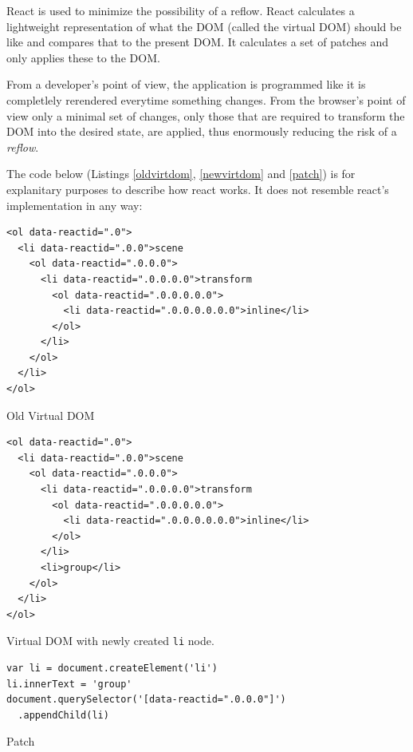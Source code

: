 React is used to minimize the possibility of a reflow. React
calculates a lightweight representation of what the \gls{DOM} (called the virtual DOM) should be like and
compares that to the present \gls{DOM}. It calculates a set of patches and
only applies these to the \gls{DOM}.

From a developer's point of view, the application is programmed like it is
completlely rerendered everytime something changes. From the browser's point
of view only a minimal set of changes, only those that are required to transform the
\gls{DOM} into the desired state, are applied, thus enormously reducing the risk of a \emph{reflow}.

The code below (Listings \ref{oldvirtdom}, \ref{newvirtdom} and \ref{patch}) is
for explanitary purposes to describe how react works. It does not resemble
react's implementation in any way:

\begin{listing}[H]
  \begin{verbatim}
<ol data-reactid=".0">
  <li data-reactid=".0.0">scene
    <ol data-reactid=".0.0.0">
      <li data-reactid=".0.0.0.0">transform
        <ol data-reactid=".0.0.0.0.0">
          <li data-reactid=".0.0.0.0.0.0">inline</li>
        </ol>
      </li>
    </ol>
  </li>
</ol>
  \end{verbatim}
  \caption{Old Virtual DOM}
  \label{oldvirtdom}
\end{listing}

\begin{listing}[H]
  \begin{verbatim}
<ol data-reactid=".0">
  <li data-reactid=".0.0">scene
    <ol data-reactid=".0.0.0">
      <li data-reactid=".0.0.0.0">transform
        <ol data-reactid=".0.0.0.0.0">
          <li data-reactid=".0.0.0.0.0.0">inline</li>
        </ol>
      </li>
      <li>group</li>
    </ol>
  </li>
</ol>
  \end{verbatim}
  \caption{Virtual DOM with newly created \texttt{li} node.}
  \label{newvirtdom}
\end{listing}

\begin{listing}[H]
  \begin{verbatim}
var li = document.createElement('li')
li.innerText = 'group'
document.querySelector('[data-reactid=".0.0.0"]')
  .appendChild(li)
  \end{verbatim}
  \caption{Patch}
  \label{patch}
\end{listing}

